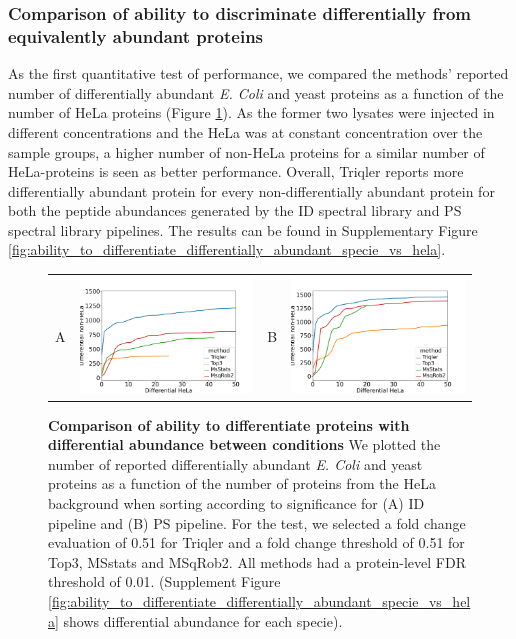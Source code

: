 \documentclass[10pt,letterpaper]{article}
\begin{document}
\subsubsection*{Comparison of ability to discriminate differentially from equivalently abundant proteins}

As the first quantitative test of performance, we compared the methods' reported number of differentially abundant {\em E. Coli} and yeast proteins as a function of the number of HeLa proteins (Figure \ref{fig:diff_vs_hela}). As the former two lysates were injected in different concentrations and the HeLa was at constant concentration over the sample groups, a higher number of non-HeLa proteins for a similar number of HeLa-proteins is seen as better performance.  Overall, Triqler reports more differentially abundant protein for every non-differentially abundant protein for both the peptide abundances generated by the ID spectral library and PS spectral library pipelines. The results can be found in Supplementary Figure \ref{fig:ability_to_differentiate_differentially_abundant_specie_vs_hela}. 

\begin{figure}[hbt]
    \centering
    \begin{tabular}{lclc} 
        A & \includegraphics[width=0.45\linewidth]{../../result/report_plots_pipeline/diff_HeLa_vs_nonHeLa_ID_all_0.51.png} & 
        B & \includegraphics[width=0.45\linewidth]{../../result/report_plots_pipeline/diff_HeLa_vs_nonHeLa_PS_all_0.51.png} \\
    \end{tabular} 
    \caption{{\bf Comparison of ability to differentiate proteins with differential abundance between conditions} We plotted the number of reported differentially abundant  {\em E. Coli} and yeast proteins as a function of the number of proteins from the HeLa background when sorting according to significance for (A) ID pipeline and (B) PS pipeline. For the test, we selected a fold change evaluation of 0.51 for Triqler and a fold change threshold of 0.51 for Top3, MSstats and MSqRob2. All methods had a protein-level FDR threshold of 0.01. (Supplement Figure \ref{fig:ability_to_differentiate_differentially_abundant_specie_vs_hela} shows differential abundance for each specie). \label{fig:diff_vs_hela}}
\end{figure}
\end{document}
